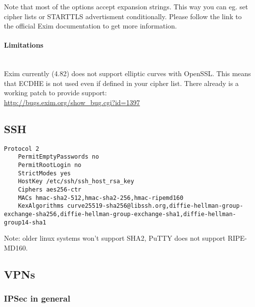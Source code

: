 Note that most of the options accept expansion strings. This way you can eg. set cipher lists or STARTTLS advertisment conditionally. Please follow the link to the official Exim documentation to get more information.

\paragraph*{Limitations}\mbox{}\\

Exim currently (4.82) does not support elliptic curves with OpenSSL. This means that ECDHE is not used even if defined in your cipher list.
There already is a working patch to provide support:\\
\url{http://bugs.exim.org/show_bug.cgi?id=1397}



\subsection{SSH}

\begin{lstlisting}[breaklines]
	Protocol 2
	PermitEmptyPasswords no
	PermitRootLogin no
	StrictModes yes
	HostKey /etc/ssh/ssh_host_rsa_key
	Ciphers aes256-ctr
	MACs hmac-sha2-512,hmac-sha2-256,hmac-ripemd160
	KexAlgorithms curve25519-sha256@libssh.org,diffie-hellman-group-exchange-sha256,diffie-hellman-group-exchange-sha1,diffie-hellman-group14-sha1
\end{lstlisting}

Note: older linux systems won't support SHA2, PuTTY does not support RIPE-MD160.
\\


\subsection{VPNs}
\subsubsection{IPSec in general}



 \\
 \\

